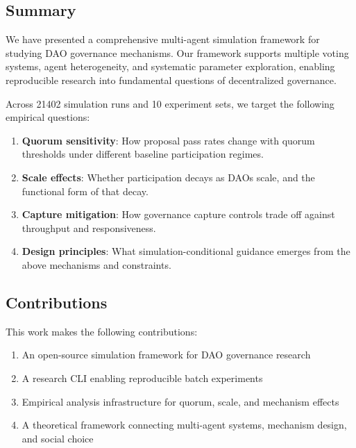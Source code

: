 
\subsection{Summary}

We have presented a comprehensive multi-agent simulation framework for studying DAO governance mechanisms. Our framework supports multiple voting systems, agent heterogeneity, and systematic parameter exploration, enabling reproducible research into fundamental questions of decentralized governance.

Across 21402 simulation runs and 10 experiment sets, we target the following empirical questions:

\begin{enumerate}
    \item \textbf{Quorum sensitivity}: How proposal pass rates change with quorum thresholds under different baseline participation regimes.

    \item \textbf{Scale effects}: Whether participation decays as DAOs scale, and the functional form of that decay.

    \item \textbf{Capture mitigation}: How governance capture controls trade off against throughput and responsiveness.

    \item \textbf{Design principles}: What simulation-conditional guidance emerges from the above mechanisms and constraints.
\end{enumerate}

\subsection{Contributions}

This work makes the following contributions:

\begin{enumerate}
    \item An open-source simulation framework for DAO governance research
    \item A research CLI enabling reproducible batch experiments
    \item Empirical analysis infrastructure for quorum, scale, and mechanism effects
    \item A theoretical framework connecting multi-agent systems, mechanism design, and social choice
\end{enumerate}

